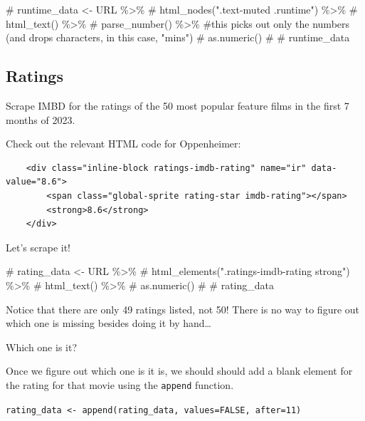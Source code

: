 \documentclass[
  letterpaper,
  DIV=11,
  numbers=noendperiod]{scrartcl}
\newenvironment{Shaded}{\begin{snugshade}}{\end{snugshade}}
\newcommand{\CommentTok}[1]{\textcolor[rgb]{0.37,0.37,0.37}{#1}}
\begin{document}
\begin{Shaded}
\begin{Highlighting}[]
\CommentTok{\# runtime\_data \textless{}{-} URL \%\textgreater{}\%}
\CommentTok{\#   html\_nodes(".text{-}muted .runtime") \%\textgreater{}\%}
\CommentTok{\#   html\_text() \%\textgreater{}\%}
\CommentTok{\#   parse\_number() \%\textgreater{}\% \#this picks out only the numbers (and drops characters, in this case, "mins")}
\CommentTok{\#   as.numeric()}
\CommentTok{\# }
\CommentTok{\# runtime\_data}
\end{Highlighting}
\end{Shaded}

\hypertarget{ratings}{%
\subsection{Ratings}\label{ratings}}

Scrape IMBD for the ratings of the 50 most popular feature films in the
first 7 months of 2023.

Check out the relevant HTML code for Oppenheimer:

\begin{verbatim}
    <div class="inline-block ratings-imdb-rating" name="ir" data-value="8.6">
        <span class="global-sprite rating-star imdb-rating"></span>
        <strong>8.6</strong>
    </div>
\end{verbatim}

Let's scrape it!

\begin{Shaded}
\begin{Highlighting}[]
\CommentTok{\# rating\_data \textless{}{-} URL \%\textgreater{}\%}
\CommentTok{\#   html\_elements(".ratings{-}imdb{-}rating strong") \%\textgreater{}\%}
\CommentTok{\#   html\_text() \%\textgreater{}\%}
\CommentTok{\#   as.numeric()}
\CommentTok{\# }
\CommentTok{\# rating\_data}
\end{Highlighting}
\end{Shaded}

\begin{tcolorbox}[enhanced jigsaw, arc=.35mm, left=2mm, colbacktitle=quarto-callout-warning-color!10!white, coltitle=black, leftrule=.75mm, rightrule=.15mm, opacitybacktitle=0.6, titlerule=0mm, colframe=quarto-callout-warning-color-frame, toptitle=1mm, breakable, bottomtitle=1mm, bottomrule=.15mm, opacityback=0, title=\textcolor{quarto-callout-warning-color}{\faExclamationTriangle}\hspace{0.5em}{Warning}, toprule=.15mm, colback=white]

Notice that there are only 49 ratings listed, not 50! There is no way to
figure out which one is missing besides doing it by hand\ldots{}

Which one is it?

Once we figure out which one is it is, we should should add a blank
element for the rating for that movie using the \texttt{append}
function.

\texttt{rating\_data\ \textless{}-\ append(rating\_data,\ values=FALSE,\ after=11)}

\end{tcolorbox}
\end{document}
